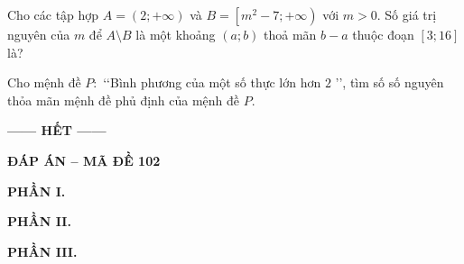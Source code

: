 \documentclass[12pt,a4paper,openany,oneside]{book}
\newcommand{\hetDe}[1]{\par\bigskip\begin{center}{\bfseries ------ HẾT ------}\end{center}\label{cuoide#1}}
\newcommand{\phanDapAn}[1]{\newpage\fancyfoot[C]{\small Đáp án -- Mã đề #1}%
  \begin{center}{\large\bfseries ĐÁP ÁN -- MÃ ĐỀ #1}\end{center}}
\begin{document}
\begin{bt}%
	Cho các tập hợp $A=\left(2;+\infty \right)$ và $B=\left[m^2-7;+\infty \right)$ với  $m > 0$. Số giá trị nguyên của $m$ để $A\setminus B$ là một khoảng $\left(a; b\right)$ thoả mãn $b-a$ thuộc đoạn $\left[3; 16\right]$ là?
\end{bt}

\begin{bt}%
	Cho mệnh đề $P\colon$ \lq\lq Bình phương của một số thực lớn hơn $ 2 $ \rq\rq, tìm số số  nguyên thỏa mãn mệnh đề phủ định của mệnh đề $P$.
\end{bt}


\hetDe{102}

\phanDapAn{102}
\par\noindent\textbf{PHẦN I.}\par
\begin{flushleft}

\end{flushleft}
\par\noindent\textbf{PHẦN II.}\par
\begin{flushleft}

\end{flushleft}
\par\noindent\textbf{PHẦN III.}\par
\begin{flushleft}

\end{flushleft}
\end{document}

